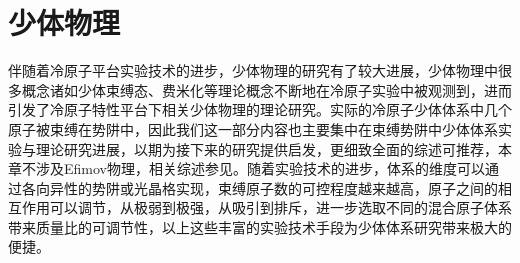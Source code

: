 \section{少体物理}\label{1sec:fewbody}
伴随着冷原子平台实验技术的进步，少体物理的研究有了较大进展，少体物理中很多概念诸如少体束缚态、费米化等理论概念不断地在冷原子实验中被观测到，进而引发了冷原子特性平台下相关少体物理的理论研究。实际的冷原子少体体系中几个原子被束缚在势阱中，因此我们这一部分内容也主要集中在束缚势阱中少体体系实验与理论研究进展，以期为接下来的研究提供启发，更细致全面的综述可推荐\cite{sowinski2019one,blume2012few}，本章不涉及Efimov物理，相关综述参见\cite{nielsen2001three,braaten2006universality,KohlerMolFRRMP}。随着实验技术的进步，体系的维度可以通过各向异性的势阱或光晶格实现，束缚原子数的可控程度越来越高，原子之间的相互作用可以调节，从极弱到极强，从吸引到排斥，进一步选取不同的混合原子体系带来质量比的可调节性，以上这些丰富的实验技术手段为少体体系研究带来极大的便捷。
\begin{comment}
实验中最早制备出费米子少体体系可以追溯到2005年，在较深的光晶格体系中,进入到莫特绝缘体区域，制备少体体系\cite{greiner2002quantum,EsslingerFermiSea,Esslinger1DMol,Esslinger3DMol,Ospelkaus3DMol,Hecker3DMol,SalaCIRMol}。如图~\ref{3dmol}~所示，
\begin{figure}[!htbp]
    \centering
    \texttt{[image: chap13dmol.png]}
    \bicaption{三维光晶格中的Feshbach分子态。散点代表不同晶格深度的实验数据。实线代表理论数据。摘自 \citep{Esslinger3DMol}}{The measured binding energy of molecules in a 3D optical lattice. Scatterd points for defferent depth of latice. The solid line for theory. Reprinted from \citep{Esslinger3DMol}}
    \label{3dmol}
\end{figure}
实验观测到了较深光晶格内调节磁场形成的Feshbach分子态。
\end{comment}


